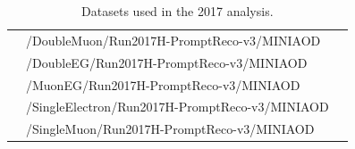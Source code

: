 \begin{table}[h]
\begin{tabular}{|l|l|l|}
 & /DoubleMuon/Run2017H-PromptReco-v3/MINIAOD &  \\
 & /DoubleEG/Run2017H-PromptReco-v3/MINIAOD &  \\
 & /MuonEG/Run2017H-PromptReco-v3/MINIAOD &  \\
 & /SingleElectron/Run2017H-PromptReco-v3/MINIAOD &  \\
 & /SingleMuon/Run2017H-PromptReco-v3/MINIAOD &  \\
\hline %
\hline %
     \end{tabular}
\small
    \caption{ Datasets used in the 2017 analysis. }
    \label{tab:datasets_dataB}
\end{table}


